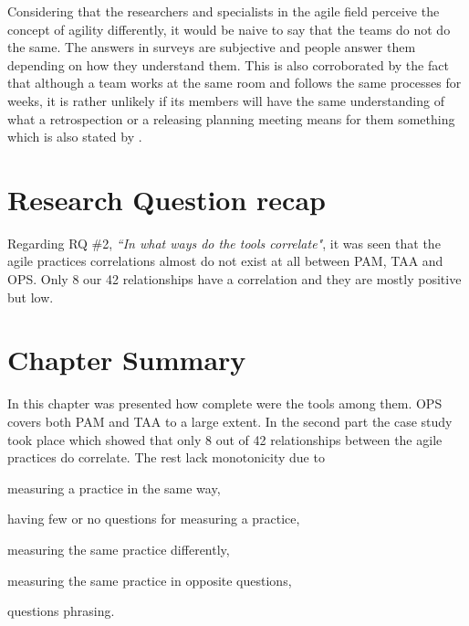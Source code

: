 Considering that the researchers and specialists in the agile field perceive the concept of agility differently, it would be naive to say that the teams do not do the same. The answers in surveys are subjective and people answer them depending on how they understand them. This is also corroborated by the fact that although a team works at the same room and follows the same processes for weeks, it is rather unlikely if its members will have the same understanding of what a retrospection or a releasing planning meeting means for them something which is also stated by \citet{Williams_Microsoft}.





\section{Research Question recap}
Regarding RQ \#2, \textit{``In what ways do the tools correlate"}, it was seen that the agile practices correlations almost do not exist at all between \ac{PAM}, \ac{TAA} and \ac{OPS}. Only 8 our 42 relationships have a correlation and they are mostly positive but low.

\section{Chapter Summary}
In this chapter was presented how complete were the tools among them. \ac{OPS} covers both \ac{PAM} and \ac{TAA} to a large extent. In the second part the case study took place which showed that only 8 out of 42 relationships between the agile practices do correlate. The rest lack monotonicity due to
\begin{inparaenum} [a\upshape)]
	\item measuring a practice in the same way,
	\item having few or no questions for measuring a practice,
	\item measuring the same practice differently,
	\item measuring the same practice in opposite questions,
	\item questions phrasing.
\end{inparaenum}
